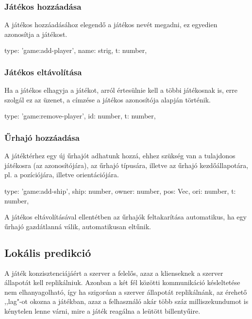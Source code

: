 \subsubsection{Játékos hozzáadása}

A játékos hozzáadásához elegendő a játékos nevét megadni, ez egyedien azonosítja
a játékost.

\begin{js}
  {
    type: 'game:add-player',
    name: strig,
    t: number,
  }
\end{js}

\subsubsection{Játékos eltávolítása}

Ha a játékos elhagyja a játékot, arról értesülnie kell a többi játékosnak is,
erre szolgál ez az üzenet, a címzése a játékos azonosítója alapján történik.

\begin{js}
  {
    type: 'game:remove-player',
    id: number,
    t: number,
  }
\end{js}

\subsubsection{Űrhajó hozzáadása}

A játéktérhez egy új űrhajót adhatunk hozzá, ehhez szükség van a tulajdonos
játékosra (az azonosítójára), az űrhajó típusára, illetve az űrhajó
kezdőállapotára, pl. a pozíciójára, illetve orientációjára.

\begin{js}
  {
    type: 'game:add-ship',
    ship: number,
    owner: number,
    pos: Vec,
    ori: number,
    t: number,
  }
\end{js}

A játékos eltávolításával ellentétben az űrhajók feltakarítása automatikus, ha
egy űrhajó gazdátlanná válik, automatikusan eltűnik.

\subsection{Lokális predikció}\label{sec:prediction}

A játék konzisztenciájáért a szerver a felelős, azaz a klienseknek a szerver
állapotát kell replikálniuk. Azonban a két fél közötti kommunikáció késleltetése
nem elhanyagolható, így ha szigorúan a szerver állapotát replikálnánk, az
érehető ,,lag"-ot okozna a játékban, azaz a felhasználó akár több száz
milliszekundumot is kénytelen lenne várni, mire a játék reagálna a leütött
billentyűire.

